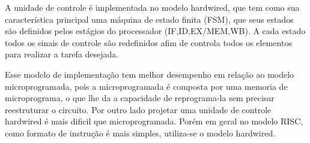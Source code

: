 \documentclass{report}
\begin{document}
A unidade de controle é implementada no modelo hardwired, que tem como sua característica principal uma máquina de estado finita (FSM), que seus estados são definidos pelos estágios do processador (IF,ID,EX/MEM,WB). A cada estado todos os sinais de controle são redefinidos afim de controla todos os elementos para realizar a tarefa desejada.

Esse modelo de implementação tem melhor desempenho em relação ao modelo microprogramada, pois a microprogramada é composta por uma memoria de microprograma, o que lhe da a capacidade de reprograma-la sem precisar reestruturar o circuito. Por outro lado projetar uma unidade de controle hardwired é mais dificil que microprogramada. Porém em geral no modelo RISC, como formato de instrução é mais simples, utiliza-se o modelo hardwired.
\newline
\end{document}
